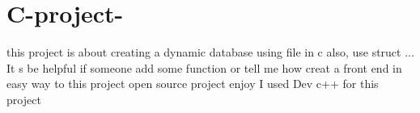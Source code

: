 \chapter{C-\/project-\/ }
\hypertarget{md__r_e_a_d_m_e}{}\label{md__r_e_a_d_m_e}
\label{md__r_e_a_d_m_e_autotoc_md0}%
%


this project is about creating a dynamic database using file in c also, use struct ... It s be helpful if someone add some function or tell me how creat a front end in easy way to this project open source project enjoy I used Dev c++ for this project 